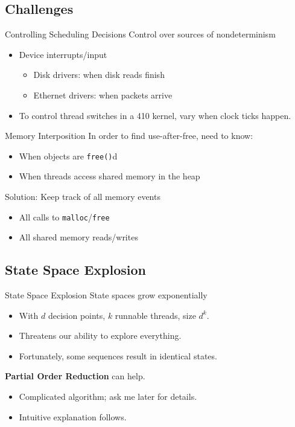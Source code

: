 \documentclass[xcolor=dvipsnames]{beamer}
\begin{document}
\subsection{Challenges}

\begin{frame}{Controlling Scheduling Decisions}
	Control over sources of nondeterminism
	\begin{itemize}
		\item Device interrupts/input
			\begin{itemize}
				\item Disk drivers: when disk reads finish
				\item Ethernet drivers: when packets arrive
			\end{itemize}
		\item To control thread switches in a 410 kernel, vary when clock ticks happen.
	\end{itemize}
\end{frame}

\begin{frame}{Memory Interposition}
	In order to find use-after-free, need to know:
	\begin{itemize}
		\item When objects are \texttt{free()}d
		\item When threads access shared memory in the heap
	\end{itemize}
	\linegap

	Solution: Keep track of all memory events
	\begin{itemize}
		\item All calls to \texttt{malloc}/\texttt{free}
		\item All shared memory reads/writes
	\end{itemize}
\end{frame}


\subsection{State Space Explosion}

\begin{frame}{State Space Explosion}
	State spaces grow exponentially
	\begin{itemize}
		\item With $d$ decision points, $k$ runnable threads, size $d^k$.
		\item Threatens our ability to explore everything.
		\item Fortunately, some sequences result in identical states.
	\end{itemize}
	\linegap

	{\bf Partial Order Reduction} can help.
	\begin{itemize}
		\item Complicated algorithm; ask me later for details.
		\item Intuitive explanation follows.
	\end{itemize}
\end{frame}
\end{document}
